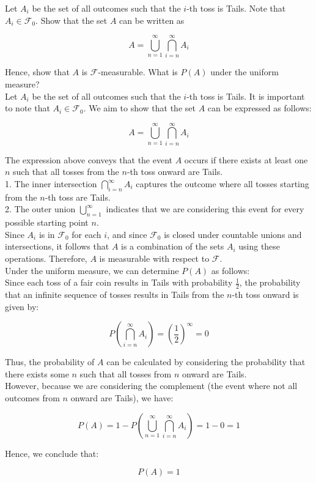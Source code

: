 \begin{example}
Let \( A_i \) be the set of all outcomes such that the \( i \)-th toss is Tails. Note that \( A_i \in \mathcal{F}_0 \). Show that the set \( A \) can be written as

\[
A = \bigcup_{n=1}^{\infty} \bigcap_{i=n}^{\infty} A_i 
\]

Hence, show that \( A \) is \( \mathcal{F} \)-measurable. What is \( P(A) \) under the uniform measure?\\

Let \( A_i \) be the set of all outcomes such that the \( i \)-th toss is Tails. It is important to note that \( A_i \in \mathcal{F}_0 \). We aim to show that the set \( A \) can be expressed as follows:

\[
A = \bigcup_{n=1}^{\infty} \bigcap_{i=n}^{\infty} A_i 
\]


The expression above conveys that the event \( A \) occurs if there exists at least one \( n \) such that all tosses from the \( n \)-th toss onward are Tails. \\

1. The inner intersection \( \bigcap_{i=n}^{\infty} A_i \) captures the outcome where all tosses starting from the \( n \)-th toss are Tails.\\
2. The outer union \( \bigcup_{n=1}^{\infty} \) indicates that we are considering this event for every possible starting point \( n \).\\

Since \( A_i \) is in \( \mathcal{F}_0 \) for each \( i \), and since \( \mathcal{F}_0 \) is closed under countable unions and intersections, it follows that \( A \) is a combination of the sets \( A_i \) using these operations. Therefore, \( A \) is measurable with respect to \( \mathcal{F} \).\\

Under the uniform measure, we can determine \( P(A) \) as follows:\\

Since each toss of a fair coin results in Tails with probability \( \frac{1}{2} \), the probability that an infinite sequence of tosses results in Tails from the \( n \)-th toss onward is given by:

\[
P\left(\bigcap_{i=n}^{\infty} A_i\right) = \left( \frac{1}{2} \right)^{\infty} = 0
\]

Thus, the probability of \( A \) can be calculated by considering the probability that there exists some \( n \) such that all tosses from \( n \) onward are Tails. \\

However, because we are considering the complement (the event where not all outcomes from \( n \) onward are Tails), we have:

\[
P(A) = 1 - P\left(\bigcup_{n=1}^{\infty} \bigcap_{i=n}^{\infty} A_i\right) = 1 - 0 = 1
\]

Hence, we conclude that:

\[
P(A) = 1
\]

\end{example}

